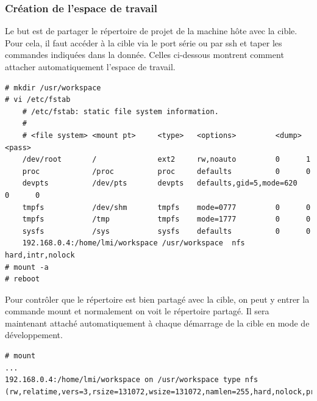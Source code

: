 \subsubsection{Création de l'espace de travail}
Le but est de partager le répertoire de projet de la machine hôte avec la cible. Pour cela, il faut accéder à la cible via le port série ou par ssh et taper les commandes indiquées dans la donnée. Celles ci-dessous montrent comment attacher automatiquement l'espace de travail.
\begin{lstlisting}
# mkdir /usr/workspace
# vi /etc/fstab
	# /etc/fstab: static file system information.
	#
	# <file system> <mount pt>     <type>   <options>         <dump> <pass>
	/dev/root       /              ext2     rw,noauto         0      1
	proc            /proc          proc     defaults          0      0
	devpts          /dev/pts       devpts   defaults,gid=5,mode=620   0      0
	tmpfs           /dev/shm       tmpfs    mode=0777         0      0
	tmpfs           /tmp           tmpfs    mode=1777         0      0
	sysfs           /sys           sysfs    defaults          0      0
	192.168.0.4:/home/lmi/workspace /usr/workspace  nfs     hard,intr,nolock
# mount -a
# reboot
\end{lstlisting}
Pour contrôler que le répertoire est bien partagé avec la cible, on peut y entrer la commande mount et normalement on voit le répertoire partagé. Il sera maintenant attaché automatiquement à chaque démarrage de la cible en mode de développement.
\begin{lstlisting}
# mount
...
192.168.0.4:/home/lmi/workspace on /usr/workspace type nfs (rw,relatime,vers=3,rsize=131072,wsize=131072,namlen=255,hard,nolock,proto=tcp,timeo=600,retrans=2,sec=sys,mountaddr=192.168.0.4,mountvers=3,mountproto=tcp,local_lock=all,addr=192.168.0.4)
\end{lstlisting}

